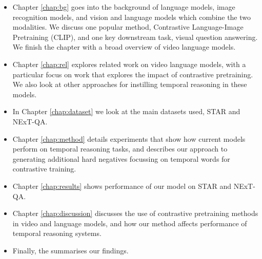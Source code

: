 \begin{itemize}
	\item Chapter \ref{chap:bg} goes into the background of language models,
		image recognition models, and vision and language models which combine
		the two modalities. We discuss one popular method, Contrastive
		Language-Image Pretraining (CLIP), and one key downstream task, visual
		question answering. We finish the chapter with a broad overview of video
		language models.
	\item Chapter \ref{chap:rel} explores related work on video language models,
		with a particular focus on work that explores the impact of contrastive
		pretraining. We also look at other approaches for instilling temporal
		reasoning in these models.
	\item In Chapter \ref{chap:dataset} we look at the main datasets used, STAR and NExT-QA.
	\item Chapter \ref{chap:method} details experiments that show how current
		models perform on temporal reasoning tasks, and describes our approach
		to generating additional hard negatives focussing on temporal words for
		contrastive training.
	\item Chapter \ref{chap:results} shows performance of our model on STAR and NExT-QA.
	\item Chapter \ref{chap:discussion} discusses the use of contrastive
		pretraining methods in video and language models, and how our method
		affects performance of temporal reasoning systems.
	\item Finally, the  summarises our findings.
\end{itemize}
